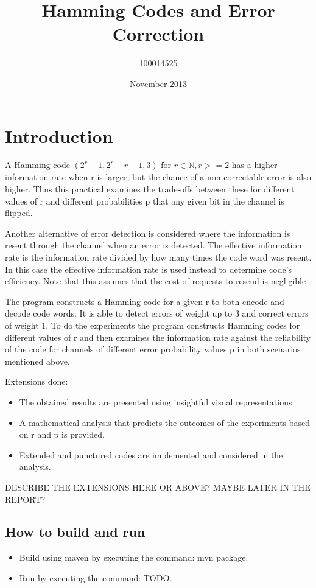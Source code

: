 \documentclass{article}
\title{Hamming Codes and Error Correction}
\author{100014525}
\date{November 2013}
\begin{document}
\maketitle

\section{Introduction}

A Hamming code $(2^r - 1, 2^r - r - 1, 3)$ for $r \in \mathbb{N}, r >= 2$ has a higher information rate when r is larger, but the chance of a non-correctable error is also higher. Thus this practical examines the trade-offs between these for different values of r and different probabilities p that any given bit in the channel is flipped.

Another alternative of error detection is considered where the information is resent through the channel when an error is detected. The effective information rate is the information rate divided by how many times the code word was resent. In this case the effective information rate is used instead to determine code's efficiency. Note that this assumes that the cost of requests to resend is negligible.

The program constructs a Hamming code for a given r to both encode and decode code words. It is able to detect errors of weight up to 3 and correct errors of weight 1. To do the experiments the program constructs Hamming codes for different values of r and then examines the information rate against the reliability of the code for channels of different error probability values p in both scenarios mentioned above.

Extensions done:
\begin{itemize}
	\item The obtained results are presented using insightful visual representations.
	\item A mathematical analysis that predicts the outcomes of the experiments based on r and p is provided.
	\item Extended and punctured codes are implemented and considered in the analysis.
\end{itemize}

DESCRIBE THE EXTENSIONS HERE OR ABOVE? MAYBE LATER IN THE REPORT?

\subsection{How to build and run}
\begin{itemize}
	\item Build using maven by executing the command: mvn package.
	\item Run by executing the command: TODO.
\end{itemize}
\end{document}
